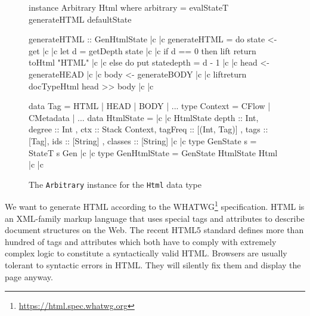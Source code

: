 \documentclass[sigconf,review,anonymous]{acmart}
\begin{document}
\begin{figure}[t]
  \begin{haskell}
instance Arbitrary Html where
  arbitrary = evalStateT generateHTML defaultState

generateHTML :: GenHtmlState |c \label{ref.generateHTML.begin} |c
generateHTML = do
  state <- get |c \label{ref.generateHTML.getState} |c   
  let d = getDepth state |c \label{ref.generateHTML.getDepth} |c
  if d == 0
  then lift \dollar return \dollar toHtml "HTML" |c \label{ref.generateHTML.returnString} |c
  else do put state{depth = d - 1} |c \label{ref.generateHTML.updateState} |c
           head <- generateHEAD |c \label{ref.generateHTML.newHead} |c
           body <- generateBODY |c \label{ref.generateHTML.newBody} |c
           lift\dollar return \dollar docTypeHtml \dollar head >> body |c \label{ref.generateHTML.end} |c

data Tag = HTML | HEAD | BODY | ...
type Context = CFlow | CMetadata | ...
data HtmlState = |c \label{ref.HtmlState.begin} |c
  HtmlState { depth    :: Int,           degree  :: Int    
             , ctx     :: Stack Context, tagFreq :: [(Int, Tag)] 
             , tags    :: [Tag],         ids     :: [String]
             , classes :: [String] } |c \label{ref.HtmlState.end} |c
type GenState s = StateT s Gen |c \label{ref.GenState} |c
type GenHtmlState = GenState HtmlState Html |c \label{ref.GenHtmlState} |c
  \end{haskell}
  \caption{The \texttt{Arbitrary} instance for the \texttt{Html} data type}
  \label{fig.html.arb.def}
\end{figure}

We want to generate HTML according to the WHATWG\footnote{\url{https://html.spec.whatwg.org}} specification. HTML is an XML-family markup language that uses special tags and attributes to describe document structures on the Web. The recent HTML5 standard defines more than hundred of tags and attributes which both have to comply with extremely complex logic to constitute a syntactically valid HTML. Browsers are usually tolerant to syntactic errors in HTML. They will silently fix them and display the page anyway.
\end{document}
